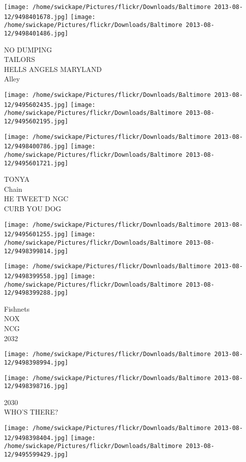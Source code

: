 \documentclass[10pt,letterpaper]{article}
\begin{document}
\texttt{[image: /home/swickape/Pictures/flickr/Downloads/Baltimore 2013-08-12/9498401678.jpg]}
\texttt{[image: /home/swickape/Pictures/flickr/Downloads/Baltimore 2013-08-12/9498401486.jpg]}

NO DUMPING\\
TAILORS\\
HELLS ANGELS MARYLAND\\
Alley\\
\pagebreak

\texttt{[image: /home/swickape/Pictures/flickr/Downloads/Baltimore 2013-08-12/9495602435.jpg]}
\texttt{[image: /home/swickape/Pictures/flickr/Downloads/Baltimore 2013-08-12/9495602195.jpg]}

\texttt{[image: /home/swickape/Pictures/flickr/Downloads/Baltimore 2013-08-12/9498400786.jpg]}
\texttt{[image: /home/swickape/Pictures/flickr/Downloads/Baltimore 2013-08-12/9495601721.jpg]}

TONYA\\
Chain\\
HE TWEET'D NGC\\
CURB YOU DOG\\
\pagebreak

\texttt{[image: /home/swickape/Pictures/flickr/Downloads/Baltimore 2013-08-12/9495601255.jpg]}
\texttt{[image: /home/swickape/Pictures/flickr/Downloads/Baltimore 2013-08-12/9498399814.jpg]}

\texttt{[image: /home/swickape/Pictures/flickr/Downloads/Baltimore 2013-08-12/9498399558.jpg]}
\texttt{[image: /home/swickape/Pictures/flickr/Downloads/Baltimore 2013-08-12/9498399288.jpg]}

Fishnets\\
NOX\\
NCG\\
2032\\
\pagebreak

\texttt{[image: /home/swickape/Pictures/flickr/Downloads/Baltimore 2013-08-12/9498398994.jpg]}

\vspace{0.25in}
\texttt{[image: /home/swickape/Pictures/flickr/Downloads/Baltimore 2013-08-12/9498398716.jpg]}

2030\\
WHO'S THERE?\\
\pagebreak

\texttt{[image: /home/swickape/Pictures/flickr/Downloads/Baltimore 2013-08-12/9498398404.jpg]}
\texttt{[image: /home/swickape/Pictures/flickr/Downloads/Baltimore 2013-08-12/9495599429.jpg]}
\end{document}
